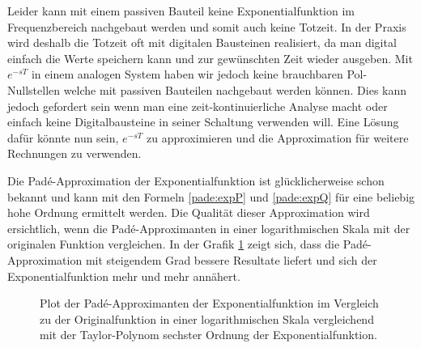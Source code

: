Leider kann mit einem passiven Bauteil keine Exponentialfunktion im Frequenzbereich nachgebaut werden und somit auch keine Totzeit.
In der Praxis wird deshalb die Totzeit oft mit digitalen Bausteinen realisiert, da man digital einfach die Werte speichern kann und zur gewünschten Zeit wieder ausgeben.
Mit $e^{-sT}$ in einem analogen System haben wir jedoch keine brauchbaren Pol- Nullstellen welche mit passiven Bauteilen nachgebaut werden können.  
Dies kann jedoch gefordert sein wenn man eine zeit-kontinuierliche Analyse macht oder einfach keine Digitalbausteine in seiner Schaltung verwenden will.
Eine Lösung dafür könnte nun sein, $e^{-sT}$ zu approximieren und die Approximation für weitere Rechnungen zu verwenden.

Die Padé-Approximation der Exponentialfunktion ist glücklicherweise schon bekannt und kann mit den Formeln \eqref{pade:expP} und \eqref{pade:expQ} für eine beliebig hohe Ordnung ermittelt werden.
Die Qualität dieser Approximation wird ersichtlich, wenn die Padé-Approximanten in einer logarithmischen Skala mit der originalen Funktion vergleichen.
In der Grafik \ref{pade:totzeitexp} zeigt sich, dass die Padé-Approximation mit steigendem Grad bessere Resultate liefert und sich der Exponentialfunktion mehr und mehr annähert.

\begin{figure}
\centering
{}
\caption{Plot der Padé-Approximanten der Exponentialfunktion
im Vergleich zu der Originalfunktion in einer logarithmischen
Skala vergleichend mit der Taylor-Polynom sechster Ordnung
der Exponentialfunktion.
\label{pade:totzeitexp}}
\end{figure}

